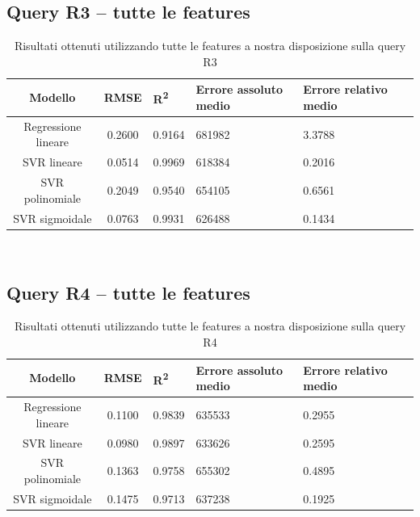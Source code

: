 \documentclass[a4paper,11pt]{article}
\begin{document}
\subsection{Query R3 -- tutte le features}
\begin{table}[H]
	\centering
	\begin{adjustbox}{center}
		\begin{tabular}{c | c M{1.2cm} M{2.5cm} M{2.5cm} M{1.8cm}}
			Modello & RMSE & R\textsuperscript{2} & Errore assoluto medio & Errore relativo medio \tabularnewline
			\hline
			Regressione lineare & 0.2600 & 0.9164 & 681982 & 3.3788 \\
			SVR lineare & 0.0514 & 0.9969 & 618384 & 0.2016 \\
			SVR polinomiale & 0.2049 & 0.9540 & 654105 & 0.6561 \\
			SVR sigmoidale & 0.0763 & 0.9931 & 626488 & 0.1434 \\
		\end{tabular}
	\end{adjustbox}
	\\
	\caption{Risultati ottenuti utilizzando tutte le features a nostra disposizione sulla query R3}
	\label{table_all_features_R3}
\end{table}

\subsection{Query R4 -- tutte le features}
\begin{table}[H]
	\centering
	\begin{adjustbox}{center}
		\begin{tabular}{c | c M{1.2cm} M{2.5cm} M{2.5cm} M{1.8cm}}
			Modello & RMSE & R\textsuperscript{2} & Errore assoluto medio & Errore relativo medio \tabularnewline
			\hline
			Regressione lineare & 0.1100 & 0.9839 & 635533 & 0.2955 \\
			SVR lineare & 0.0980 & 0.9897 & 633626 & 0.2595 \\
			SVR polinomiale & 0.1363 & 0.9758 & 655302 & 0.4895 \\
			SVR sigmoidale & 0.1475 & 0.9713 & 637238 & 0.1925 \\
		\end{tabular}
	\end{adjustbox}
	\\
	\caption{Risultati ottenuti utilizzando tutte le features a nostra disposizione sulla query R4}
	\label{table_all_features_R4}
\end{table}
\end{document}
